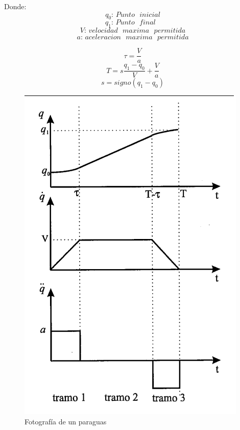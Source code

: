     Donde:
    \begin{equation*}
       \text{$q_0$: $Punto$ $inicial$}
    \end{equation*}
    \begin{equation*}
       \text{$q_1$: $Punto$ $final$ }
    \end{equation*}
    \begin{equation*}
       \text{$V$: $velocidad$ $maxima$ $permitida$}
    \end{equation*}
    \begin{equation*}
       \text{$a$: $aceleracion$ $maxima$ $permitida$}
    \end{equation*}
    
    \newpage
    
    \begin{equation}
        \tau=\frac{V}{a}
    \label{eq:cap6_tray_4}
    \end{equation}
    \begin{equation}
        T=s\frac{q_1-q_0}{V}+\frac{V}{a}
    \label{eq:cap6_tray_5}
    \end{equation}
    \begin{equation}
        s=signo(q_1-q_0)
    \label{eq:cap6_tray_6}
    \end{equation}
    

     \begin{figure}[htb]
            \centering
            \includegraphics[width=0.7\linewidth]{Main/Chapter6/Images6/cap6_trayectory_2.png}
            \caption{Fotografía de un paraguas}
            \label{f:cap6_trayectory_2}
        \end{figure} 


